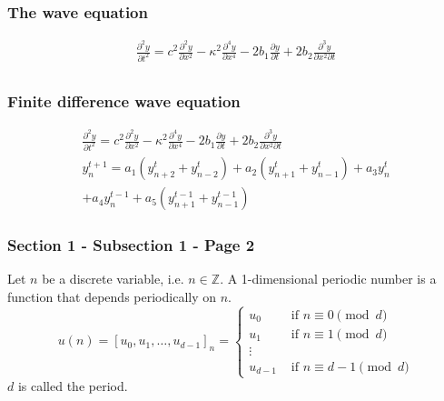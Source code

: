 \documentclass{beamer}
\newcommand{\field}[1]{\mathbb{#1}}
\newcommand{\Zset}{\field{Z}}
\begin{document}
\begin{frame}\frametitle{The wave equation}
	\begin{gather*}
	\frac{\partial^2 y}{\partial t^2} = c^2\frac{\partial^2 y}{\partial x^2}-\kappa^2\frac{\partial^4y}{\partial x^4}-2b_1\frac{\partial y}{\partial t} + 2b_2 \frac{\partial^3y}{\partial x^2\partial t}\\
\end{gather*}
\end{frame}

\begin{frame}\frametitle{Finite difference wave equation}
	\begin{gather*}
	\frac{\partial^2 y}{\partial t^2} = c^2\frac{\partial^2 y}{\partial x^2}-\kappa^2\frac{\partial^4y}{\partial x^4}-2b_1\frac{\partial y}{\partial t} + 2b_2 \frac{\partial^3y}{\partial x^2\partial t}\\
y_n^{t+1} = a_1\left(y_{n+2}^t+y_{n-2}^t\right)+a_2\left(y_{n+1}^t+y_{n-1}^t\right)+a_3y_n^t\\
+a_4y_n^{t-1}+a_5\left(y_{n+1}^{t-1}+y_{n-1}^{t-1}\right)
\end{gather*}
\end{frame}






\begin{frame}\frametitle{Section 1 - Subsection 1 - Page 2}
	\begin{definition}
		Let $n$ be a discrete variable, i.e. $n\in\Zset$.
		A 1-dimensional periodic number is a function that depends periodically on $n$.
		$$
		u(n)=
		[u_0,u_1,\ldots,u_{d-1}]_n=
		\begin{cases}
			u_0 & \mbox{ if $n\equiv 0 \pmod d$} \\
			u_1 & \mbox{ if $n\equiv 1 \pmod d$} \\
			\vdots \\
			u_{d-1} & \mbox{ if $n\equiv d-1 \pmod d$}
		\end{cases}
		$$
		$d$ is called the period.
	\end{definition}
\end{frame}
\end{document}
